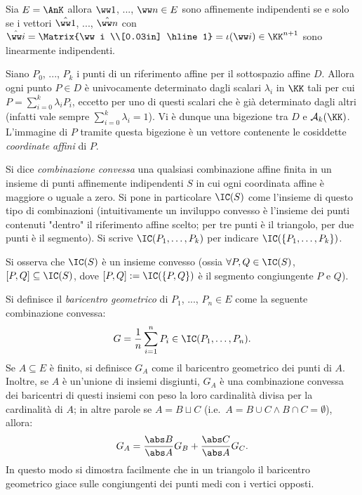 \documentclass[10pt,landscape]{article}
\begin{document}
\begin{multicols}{3}
        Sia $E = \AnK$ allora $\ww 1$, ..., $\ww n \in E$ sono affinemente indipendenti se e solo se i vettori $\hat{\ww 1}$, ..., $\hat{\ww n}$ con $\hat{\ww i}=\Matrix{\ww i \\[0.03in] \hline 1} = \iota(\ww i) \in \KK^{n+1}$ sono linearmente indipendenti. \\ \vskip 0.05in

		Siano $P_0$, ..., $P_k$ i punti di un riferimento
		affine per il sottospazio affine $D$. Allora ogni
		punto $P \in D$ è univocamente determinato dagli
		scalari $\lambda_i$ in $\KK$ tali per cui $P = \sum_{i=0}^k \lambda_i P_i$, eccetto per uno di questi scalari che è già determinato dagli altri (infatti vale sempre $\sum_{i=0}^k \lambda_i = 1$). Vi è dunque una bigezione tra $D$ e $\mathcal{A}_k(\KK)$. L'immagine di $P$
		tramite questa bigezione è un vettore contenente
		le cosiddette \textit{coordinate affini} di $P$.

		Si dice \textit{combinazione convessa} una qualsiasi
		combinazione affine finita in un insieme di punti affinemente indipendenti $S$ in cui ogni coordinata affine è maggiore o
		uguale a zero. Si pone in particolare $\IC(S)$ come
		l'insieme di questo tipo di combinazioni (intuitivamente un inviluppo convesso è l'insieme dei punti contenuti "dentro" il riferimento affine scelto; per tre punti è il triangolo, per due punti è il segmento). Si scrive $\IC(P_1, \ldots, P_k)$ per indicare $\IC(\{P_1, \ldots, P_k\})$. \\ \vskip 0.05in 
		
		Si osserva che $\IC(S)$ è un insieme
		convesso (ossia $\forall P, Q \in \IC(S)$, $[P, Q] \subseteq \IC(S)$, dove $[P, Q] := \IC(\{P, Q\})$ è il segmento congiungente $P$ e $Q$).

        Si definisce il \textit{baricentro geometrico} di $P_1$, ..., $P_n\in E$ come la seguente combinazione convessa: 
        \[ G=\frac{1}{n}\sum_{i=1}^{n}P_i \in \IC(P_1, \ldots, P_n). \]
        Se $A \subseteq E$ è finito, si definisce $G_A$ come il baricentro geometrico dei punti di $A$. Inoltre,
        se $A$ è un'unione di insiemi disgiunti, $G_A$ è
        una combinazione convessa dei baricentri di questi insiemi con peso la loro cardinalità divisa per la
        cardinalità di $A$; in altre parole se $A=B \sqcup C$ (i.e.~$A = B \cup C \land B \cap C = \emptyset$), allora:
        \[ G_A = \frac{\abs B}{\abs A} G_B + \frac{\abs C}{\abs A} G_C. \]
     	In questo modo si dimostra facilmente che in un triangolo il baricentro geometrico giace sulle
     	congiungenti dei punti medi con i vertici opposti.


\end{multicols}
\end{document}
